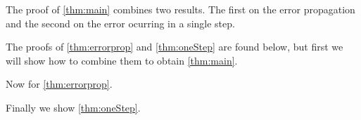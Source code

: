 The proof of \cref{thm:main} combines two results.
The first on the error propagation and the second on the error
ocurring in a single step.


The proofs of \cref{thm:errorprop} and \cref{thm:oneStep} are
found below, but first 
we will show how to combine them to obtain
\cref{thm:main}.

Now for \cref{thm:errorprop}.

Finally we show \cref{thm:oneStep}.


